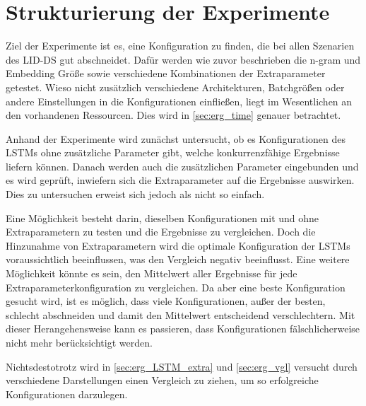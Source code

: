 \section{Strukturierung der Experimente}\label{sec:erg_struk}
    Ziel der Experimente ist es, eine Konfiguration zu finden, die bei allen Szenarien des \ac{LID-DS} gut abschneidet.
    Dafür werden wie zuvor beschrieben die n-gram und Embedding Größe sowie verschiedene Kombinationen der Extraparameter getestet. 
    Wieso nicht zusätzlich verschiedene Architekturen, Batchgrößen oder andere Einstellungen in die Konfigurationen einfließen, liegt im Wesentlichen an den vorhandenen Ressourcen.
    Dies wird in \autoref{sec:erg_time} genauer betrachtet.\par\medskip
    Anhand der Experimente wird zunächst untersucht, ob es Konfigurationen des \acp{LSTM} ohne zusätzliche Parameter gibt, welche konkurrenzfähige Ergebnisse liefern können.
    Danach werden auch die zusätzlichen Parameter eingebunden und es wird geprüft, inwiefern sich die Extraparameter auf die Ergebnisse auswirken.
    Dies zu untersuchen erweist sich jedoch als nicht so einfach.\par\medskip
    Eine Möglichkeit besteht darin, dieselben Konfigurationen mit und ohne Extraparametern zu testen und die Ergebnisse zu vergleichen.
    Doch die Hinzunahme von Extraparametern wird die optimale Konfiguration der \acp{LSTM} voraussichtlich beeinflussen, was den Vergleich negativ beeinflusst.
    Eine weitere Möglichkeit könnte es sein, den Mittelwert aller Ergebnisse für jede Extraparameterkonfiguration zu vergleichen.
    Da aber eine beste Konfiguration gesucht wird, ist es möglich, dass viele Konfigurationen, außer der besten, schlecht abschneiden und damit den Mittelwert entscheidend verschlechtern.
    Mit dieser Herangehensweise kann es passieren, dass Konfigurationen fälschlicherweise nicht mehr berücksichtigt werden.\par\medskip
    Nichtsdestotrotz wird in \autoref{sec:erg_LSTM_extra} und \autoref{sec:erg_vgl} versucht durch verschiedene Darstellungen einen Vergleich zu ziehen, um so erfolgreiche Konfigurationen darzulegen.

